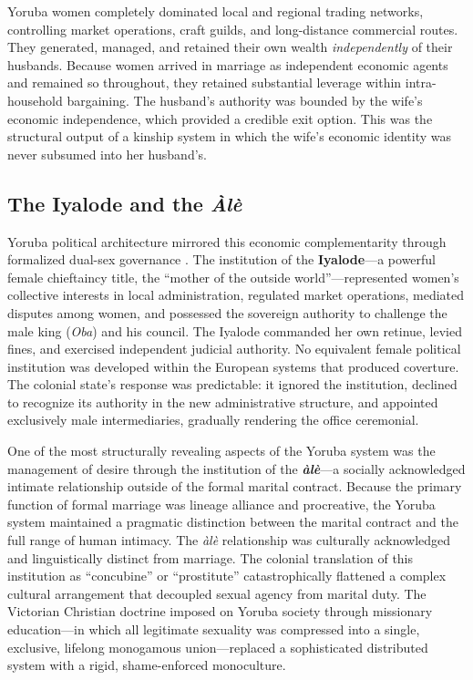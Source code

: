 Yoruba women completely dominated local and regional trading networks, controlling market operations, craft guilds, and long-distance commercial routes. They generated, managed, and retained their own wealth \textit{independently} of their husbands. Because women arrived in marriage as independent economic agents and remained so throughout, they retained substantial leverage within intra-household bargaining. The husband's authority was bounded by the wife's economic independence, which provided a credible exit option. This was the structural output of a kinship system in which the wife's economic identity was never subsumed into her husband's.

\subsection{The Iyalode and the \textit{\`{A}l\`{e}}}
\label{sec:iyalode}

Yoruba political architecture mirrored this economic complementarity through formalized dual-sex governance \cite{colonial_yoruba, oyewumi_invention}. The institution of the \textbf{Iyalode}---a powerful female chieftaincy title, the ``mother of the outside world''---represented women's collective interests in local administration, regulated market operations, mediated disputes among women, and possessed the sovereign authority to challenge the male king (\textit{Oba}) and his council. The Iyalode commanded her own retinue, levied fines, and exercised independent judicial authority. No equivalent female political institution was developed within the European systems that produced coverture. The colonial state's response was predictable: it ignored the institution, declined to recognize its authority in the new administrative structure, and appointed exclusively male intermediaries, gradually rendering the office ceremonial.

One of the most structurally revealing aspects of the Yoruba system was the management of desire through the institution of the \textbf{\textit{\`{a}l\`{e}}}---a socially acknowledged intimate relationship outside of the formal marital contract. Because the primary function of formal marriage was lineage alliance and procreative, the Yoruba system maintained a pragmatic distinction between the marital contract and the full range of human intimacy. The \textit{\`{a}l\`{e}} relationship was culturally acknowledged and linguistically distinct from marriage. The colonial translation of this institution as ``concubine'' or ``prostitute'' catastrophically flattened a complex cultural arrangement that decoupled sexual agency from marital duty. The Victorian Christian doctrine imposed on Yoruba society through missionary education---in which all legitimate sexuality was compressed into a single, exclusive, lifelong monogamous union---replaced a sophisticated distributed system with a rigid, shame-enforced monoculture.

